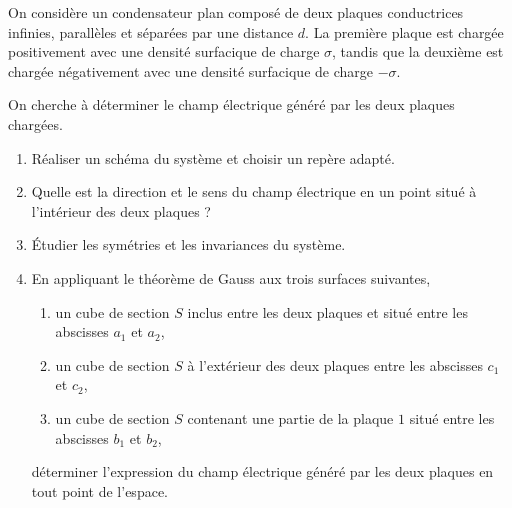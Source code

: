 \begin{exocor}
On considère un condensateur plan composé de deux plaques conductrices infinies,
parallèles et séparées par une distance $d$. La
première plaque est chargée positivement avec une densité surfacique de charge
$\sigma$, tandis que la deuxième est chargée négativement avec une densité 
surfacique de charge $-\sigma$.

On cherche à déterminer le champ électrique généré par les deux plaques chargées.

\begin{enumerate}
	\item Réaliser un schéma du système et choisir un repère adapté.
	\item Quelle est la direction et le sens du champ électrique en un point
	  situé à l'intérieur des deux plaques ?
	\item Étudier les symétries et les invariances du système. 
	\item En appliquant le théorème de Gauss aux trois surfaces suivantes,
	  	  	\begin{enumerate}
			\item un cube de section $S$ inclus entre les deux plaques 
			  et situé entre les abscisses $a_1$ et $a_2$,
			\item un cube de section $S$ à l'extérieur des deux plaques
			  entre les abscisses $c_1$ et $c_2$,
			\item un cube de section $S$ contenant une partie 
			  de la plaque $1$ situé entre les abscisses $b_1$ et
			  $b_2$,

		\end{enumerate}
	déterminer l'expression du champ électrique généré par les deux plaques
	en tout point de l'espace.
\end{enumerate}
\end{exocor}
\newpage


